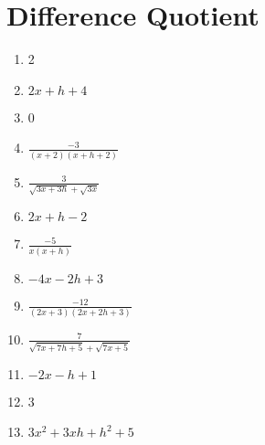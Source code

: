 \section*{Difference Quotient}

\begin{enumerate}
	\item 2
	\item $2x + h + 4$
	\item 0
    \item $\frac{-3}{(x+2)(x+h+2)}$
    \item $\frac{3}{\sqrt{3x+3h}+\sqrt{3x}}$
    \item $2x+h-2$
    \item $\frac{-5}{x(x+h)}$
    \item $-4x-2h+3$
    \item $\frac{-12}{(2x+3)(2x+2h+3)}$
    \item $\frac{7}{\sqrt{7x+7h+5}+\sqrt{7x+5}}$
    \item $-2x - h + 1$
    \item 3
    \item $3x^2 + 3xh + h^2 + 5$
\end{enumerate}